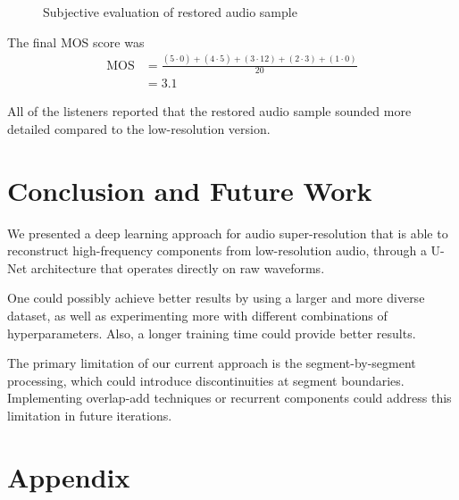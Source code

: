 \documentclass{article}
\begin{document}
\begin{figure}[!htb]
    \centering
    \caption{Subjective evaluation of restored audio sample}
    \label{fig:qualitative}
\end{figure}

The final MOS score was
\begin{align*}
    \text{MOS} &= \frac{(5 \cdot 0) + (4 \cdot 5) + (3 \cdot 12) + (2 \cdot 3) + (1 \cdot 0)}{20} \\
    &= 3.1
\end{align*}

All of the listeners reported that the restored audio sample sounded more detailed compared to the low-resolution version.

\section{Conclusion and Future Work}

We presented a deep learning approach for audio super-resolution that is able to reconstruct high-frequency components from low-resolution audio, through a U-Net architecture that operates directly on raw waveforms.

One could possibly achieve better results by using a larger and more diverse dataset, as well as experimenting more with different combinations of hyperparameters.
Also, a longer training time could provide better results.

The primary limitation of our current approach is the segment-by-segment processing, which could introduce discontinuities at segment boundaries.
Implementing overlap-add techniques or recurrent components could address this limitation in future iterations.

\section{Appendix}
\end{document}
